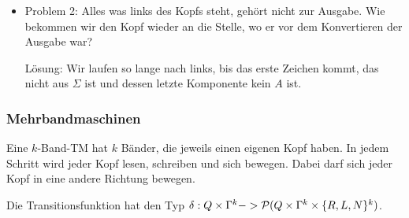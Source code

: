 \begin{Bemerkung}
\begin{enumerate}
\begin{itemize}
  \item Problem 2: Alles was links des Kopfs steht, gehört nicht zur Ausgabe.
  Wie bekommen wir den Kopf wieder an die Stelle, wo er vor dem Konvertieren der Ausgabe war?
  
  Lösung: Wir laufen so lange nach links, bis das erste Zeichen kommt, das nicht aus $\Sigma$ ist und dessen letzte Komponente kein $A$ ist.
 \qedhere
 \end{itemize}
\end{enumerate}
\end{Bemerkung}



\subsubsection{Mehrbandmaschinen}

Eine $k$-Band-\ac{TM} hat $k$ Bänder, die jeweils einen eigenen Kopf haben.
In jedem Schritt wird jeder Kopf lesen, schreiben und sich bewegen.
Dabei darf sich jeder Kopf in eine andere Richtung bewegen.

Die Transitionsfunktion hat den Typ $\delta: Q\times\Gamma^k\--> \mathcal{P}(Q\times\Gamma^k\times\{R,L,N\}^k)$.


